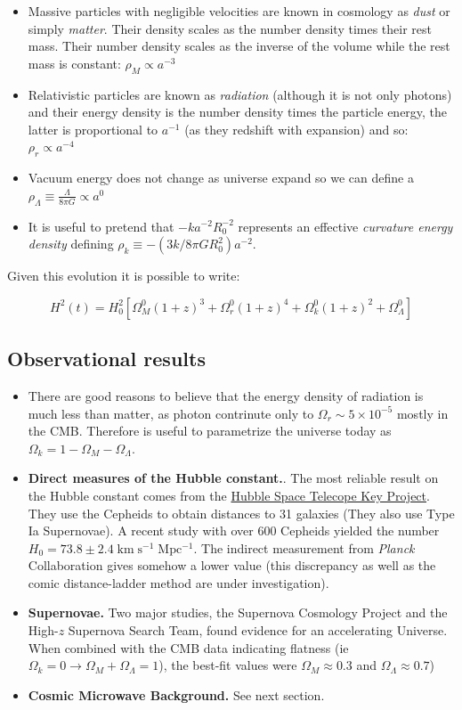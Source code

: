 \documentclass[
  letterpaper,
  DIV=11,
  numbers=noendperiod]{scrreprt}
\providecommand{\tightlist}{%
  \setlength{\itemsep}{0pt}\setlength{\parskip}{0pt}}\usepackage{longtable,booktabs,array}
\begin{document}
\begin{itemize}
\tightlist
\item
  Massive particles with negligible velocities are known in cosmology as
  \emph{dust} or simply \emph{matter}. Their density scales as the
  number density times their rest mass. Their number density scales as
  the inverse of the volume while the rest mass is constant:
  \(\rho_M \propto a^{-3}\)
\item
  Relativistic particles are known as \emph{radiation} (although it is
  not only photons) and their energy density is the number density times
  the particle energy, the latter is proportional to \(a^{-1}\) (as they
  redshift with expansion) and so: \(\rho_r \propto a^{-4}\)
\item
  Vacuum energy does not change as universe expand so we can define a
  \(\rho_\Lambda \equiv \frac{\Lambda}{8\pi G} \propto a^0\)
\item
  It is useful to pretend that \(-ka^{-2}R_0^{-2}\) represents an
  effective \emph{curvature energy density} defining
  \(\rho_k \equiv -(3k/8\pi G R^2_0)a^{-2}\).
\end{itemize}

Given this evolution it is possible to write:

\[ H^2(t) = H^2_0 [\Omega^0_M(1+z)^3 + \Omega^0_r(1+z)^4 + \Omega^0_k(1+z)^2 +\Omega^0_\Lambda]\]

\subsection{Observational results}\label{observational-results}

\begin{itemize}
\item
  There are good reasons to believe that the energy density of radiation
  is much less than matter, as photon contrinute only to
  \(\Omega_r \sim 5 \times 10^{-5}\) mostly in the CMB. Therefore is
  useful to parametrize the universe today as
  \(\Omega_k = 1 - \Omega_M - \Omega_\Lambda\).
\item
  \textbf{Direct measures of the Hubble constant.}. The most reliable
  result on the Hubble constant comes from the
  \href{http://iopscience.iop.org/0004-637X/553/1/47}{Hubble Space
  Telecope Key Project}. They use the Cepheids to obtain distances to 31
  galaxies (They also use Type Ia Supernovae). A recent study with over
  600 Cepheids yielded the number
  \(H_0 = 73.8 \pm 2.4 \mathrm{\;km\;s^{-1}\; Mpc^{-1}}\). The indirect
  measurement from \emph{Planck} Collaboration gives somehow a lower
  value (this discrepancy as well as the comic distance-ladder method
  are under investigation).
\item
  \textbf{Supernovae.} Two major studies, the Supernova Cosmology
  Project and the High-\(z\) Supernova Search Team, found evidence for
  an accelerating Universe. When combined with the CMB data indicating
  flatness (ie
  \(\Omega_k = 0 \rightarrow \Omega_M + \Omega_\Lambda = 1\)), the
  best-fit values were \(\Omega_M \approx 0.3\) and
  \(\Omega_\Lambda \approx 0.7\))
\item
  \textbf{Cosmic Microwave Background.} See next section.
\end{itemize}
\end{document}
